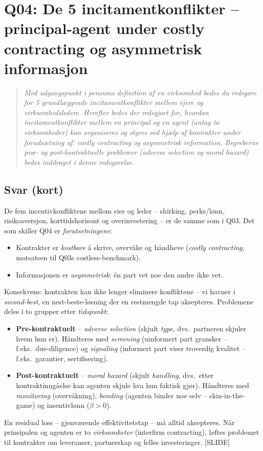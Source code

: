 \section{Q04: De 5 incitamentkonflikter -- principal-agent under costly contracting og asymmetrisk informasjon}\label{q:04}

\begin{quote}
\emph{Med udgangspunkt i pensums definition af en virksomhed bedes du redegøre for 5 grundlæggende incitamentkonflikter mellem ejere og virksomhedsledere. Herefter bedes der redegjort for, hvordan incitamentkonflikter mellem en principal og en agent (antag to virksomheder) kan organiseres og styres ved hjælp af kontrakter under forudsætning af: costly contracting og asymmetrisk information. Begreberne præ- og post-kontraktuelle problemer (adverse selection og moral hazard) bedes inddraget i denne redegørelse.}
\end{quote}

\subsection*{Svar (kort)}
De fem incentivkonfliktene mellom eier og leder -- shirking, perks/lønn, risikoaversjon, korttidshorisont og overinvestering -- er de samme som i Q03. Det som skiller Q04 er \emph{forutsetningene}:
\begin{itemize}\setlength{\itemsep}{2pt}
\item Kontrakter er \emph{kostbare} å skrive, overvåke og håndheve (\emph{costly contracting}, motsatsen til Q03s costless-benchmark).
\item Informasjonen er \emph{asymmetrisk}: én part vet noe den andre ikke vet.
\end{itemize}
Konsekvens: kontrakten kan ikke lenger eliminere konfliktene -- vi havner i \emph{second-best}, en nest-beste-løsning der en restmengde tap aksepteres. Problemene deles i to grupper etter \emph{tidspunkt}:
\begin{itemize}\setlength{\itemsep}{2pt}
\item \textbf{Pre-kontraktuelt} -- \emph{adverse selection} (skjult \emph{type}, dvs.\ partneren skjuler hvem hun er). Håndteres med \emph{screening} (uinformert part gransker -- f.eks.\ due-diligence) og \emph{signaling} (informert part viser troverdig kvalitet -- f.eks.\ garantier, sertifisering).
\item \textbf{Post-kontraktuelt} -- \emph{moral hazard} (skjult \emph{handling}, dvs.\ etter kontraktinngåelse kan agenten skjule hva hun faktisk gjør). Håndteres med \emph{monitoring} (overvåkning), \emph{bonding} (agenten binder noe selv -- skin-in-the-game) og insentivlønn ($\beta > 0$).
\end{itemize}
En residual loss -- gjenværende effektivitetstap -- må alltid aksepteres. Når prinsipalen og agenten er to \emph{virksomheter} (interfirm contracting), løftes problemet til kontrakter om leveranser, partnerskap og felles investeringer. [SLIDE]

